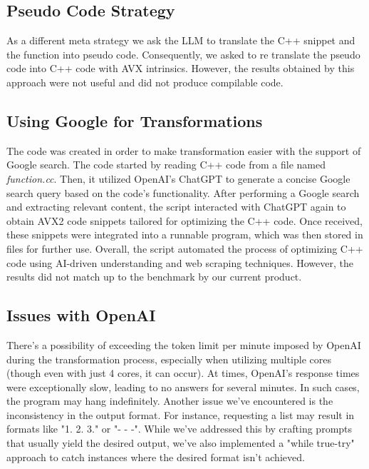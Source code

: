 \documentclass[twocolumn]{article}
\begin{document}
\subsection{Pseudo Code Strategy}
As a different meta strategy we ask the LLM to translate the C++ snippet and the function into pseudo code. Consequently, we asked to re translate the pseudo code into C++ code with AVX intrinsics. However, the results obtained by this approach were not useful and did not produce compilable code.  

\subsection{Using Google for Transformations}
The code was created in order to make transformation easier with the support of Google search. The code started by reading C++ code from a file named \textit{function.cc}. Then, it utilized OpenAI's ChatGPT to generate a concise Google search query based on the code's functionality. After performing a Google search and extracting relevant content, the script interacted with ChatGPT again to obtain AVX2 code snippets tailored for optimizing the C++ code. Once received, these snippets were integrated into a runnable program, which was then stored in files for further use. Overall, the script automated the process of optimizing C++ code using AI-driven understanding and web scraping techniques. However, the results did not match up to the benchmark by our current product. 

\subsection{Issues with OpenAI}
There's a possibility of exceeding the token limit per minute imposed by OpenAI during the transformation process, especially when utilizing multiple cores (though even with just 4 cores, it can occur). At times, OpenAI's response times were exceptionally slow, leading to no answers for several minutes. In such cases, the program may hang indefinitely. Another issue we've encountered is the inconsistency in the output format. For instance, requesting a list may result in formats like "1. 2. 3." or "- - -". While we've addressed this by crafting prompts that usually yield the desired output, we've also implemented a "while true-try" approach to catch instances where the desired format isn't achieved.
\end{document}
